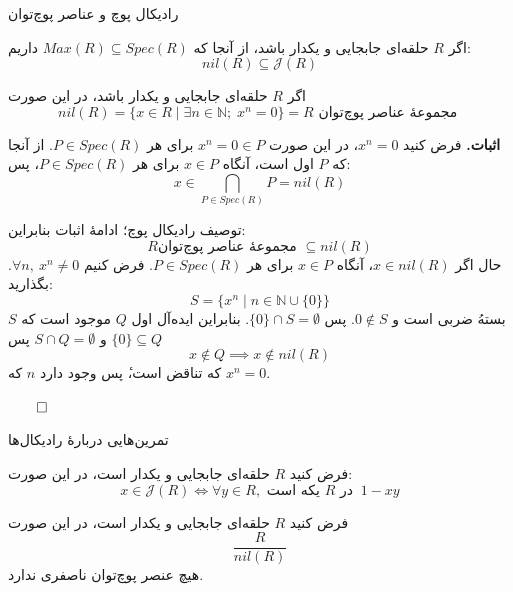 \begin{frame}[t]{رادیکال پوچ و عناصر پوچ‌توان}
    \begin{remark}
        اگر $R$ حلقه‌ای جابجایی و یکدار باشد،
        از آنجا که $Max(R) \subseteq Spec(R)$ داریم:
        \[
            nil(R) \subseteq \mathcal{J}(R)
        \]
    \end{remark}

    \begin{theorem}
        اگر $R$ حلقه‌ای جابجایی و یکدار باشد، در این صورت
        $$nil(R) = \{ x \in R \mid \exists n \in \mathbb{N} ; \; x^n = 0 \} = R \text{ مجموعهٔ عناصر پوچ‌توان  } $$

    \end{theorem}

    \textbf{اثبات.}
    فرض کنید $x^n = 0 $، در این صورت
    $x^n = 0 \in P$
    برای هر $P \in Spec(R)$.
    از آنجا که
    \(P\)
    اول است،
    آنگاه $x \in P$ برای هر $P \in Spec(R)$، پس:
    \[
        x \in \bigcap_{P \in Spec(R)} P = nil(R)
    \]
\end{frame}

\begin{frame}[t]{توصیف رادیکال پوچ؛ ادامهٔ اثبات}
    بنابراین:
    \[
        R \text{مجموعهٔ عناصر پوچ‌توان } \subseteq nil(R)
    \]
    حال
    اگر $x \in nil(R)$، آنگاه $x \in P$ برای هر $P \in Spec(R)$.
    فرض کنیم $\forall n,\ x^n \ne 0$.
    بگذارید:
    \[
        S = \{x^n \mid n \in \mathbb{N} \cup \{0\} \}
    \]
    $S$
    بستهُ ضربی است و
    $0 \notin S$.
    پس
    \(\{0\} \cap S = \emptyset\). بنابراین ایده‌آل اول
    $Q$
    موجود است که
    \(\{0\} \subseteq Q\)
    و
    $S \cap Q = \emptyset$
    پس
    \[
        x \notin Q \implies x \notin nil(R)
    \]
    که تناقض است،ٔ پس وجود دارد \(n\) که \(x^n = 0\).

    \hfill
    \(\qed\)
\end{frame}


\begin{frame}[t]{تمرین‌هایی دربارهٔ رادیکال‌ها}
    \begin{exercise}
        فرض کنید
        \(R\)
        حلقه‌ای جابجایی و یکدار است، در این صورت:
        $$x \in \mathcal{J}(R) \iff \forall y \in R, \text{ یکه است } R \text{ در } \ 1 - xy  $$
    \end{exercise}

    \begin{exercise}
        فرض کنید
        \(R\)
        حلقه‌ای جابجایی و یکدار است، در این صورت
        \[
            \frac{R}{nil(R)}
        \]
        هیچ عنصر پوچ‌توان ناصفری ندارد.
    \end{exercise}
\end{frame}